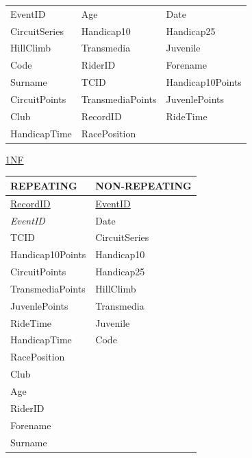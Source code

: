 \begin{tabular}{l l l}
EventID       & Age              & Date             \\
CircuitSeries & Handicap10       & Handicap25       \\
HillClimb     & Transmedia       & Juvenile         \\
Code          & RiderID          & Forename         \\
Surname       & TCID             & Handicap10Points \\
CircuitPoints & TransmediaPoints & JuvenlePoints    \\
 Club         & RecordID         & RideTime         \\
HandicapTime  & RacePosition     &                  \\
\end{tabular}

\underline{1NF}

\begin{tabular}{|l|l|}
\hline
REPEATING            & NON-REPEATING       \\ \hline
\underline{RecordID} & \underline{EventID} \\ \hline
\emph{EventID}       & Date                \\ \hline
TCID                 & CircuitSeries       \\ \hline
Handicap10Points     & Handicap10          \\ \hline
CircuitPoints        & Handicap25          \\ \hline 
TransmediaPoints     & HillClimb           \\ \hline 
JuvenlePoints        & Transmedia          \\ \hline
RideTime             & Juvenile            \\ \hline 
HandicapTime         & Code                \\ \hline
RacePosition         &                     \\ \hline
Club                 &                     \\ \hline
Age                  &                     \\ \hline
RiderID              &                     \\ \hline
Forename             &                     \\ \hline
Surname              &                     \\ \hline

\end{tabular}



